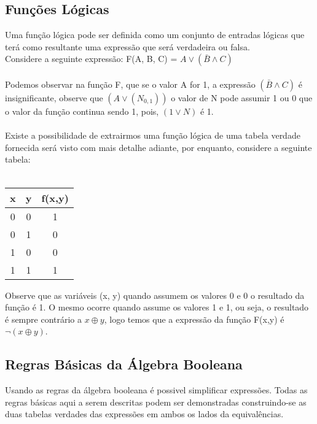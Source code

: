 \documentclass[12pt, onecolumn]{article}
\begin{document}
		\subsection{\centering Funções Lógicas}
	
	Uma função lógica pode ser definida como um conjunto de entradas lógicas
	que terá como resultante uma expressão que será verdadeira ou falsa.\\
	Considere a seguinte expressão: F(A, B, C) = $A \lor (\bar{B} \land C)$\\
	\\
	Podemos observar na função F, que se o valor A for 1, a expressão 
	$(\bar{B} \land C)$ é insignificante, observe que $(A \lor (N_{0,1}))$ 
	o valor de N pode assumir 1 ou 0 que o valor da função continua sendo 1, 
	pois, $(1 \lor N)$ é 1.\\
	\\
	
	Existe a possibilidade de extrairmos uma função lógica de uma tabela 
	verdade fornecida será visto com mais detalhe adiante, por enquanto,
	considere a seguinte tabela:\\
	\\
	\begin{table}[ht]
		\centering
		\begin{tabular}{|c|c|c|}
			\hline
			x & y & f(x,y)\\ \hline

			0 & 0 & 1 \\ \hline
			0 & 1 & 0 \\ \hline
			1 & 0 & 0 \\ \hline
			1 & 1 & 1 \\ \hline 
		\end{tabular}
	\end{table}

	Observe que as variáveis (x, y) quando assumem os valores 0 e 0
	o resultado da função é 1. O mesmo ocorre quando assume os valores
	1 e 1, ou seja, o resultado é sempre contrário a $x \oplus y$, logo 
	temos que a expressão da função F(x,y) é $\lnot (x \oplus y)$.

		\subsection{\centering Regras Básicas da Álgebra Booleana}

	Usando as regras da álgebra booleana é possivel simplificar expressões.
	Todas as regras básicas aqui a serem descritas podem ser demonstradas 
	construindo-se as duas tabelas verdades das expressões em ambos os
	lados da equivalências.\\
\end{document}
